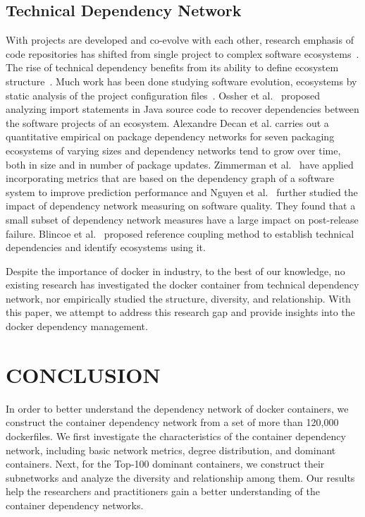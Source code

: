 \documentclass[sigconf]{acmart}
\begin{document}
\subsection{Technical Dependency Network}
With projects are developed and co-evolve with each other, research emphasis of code repositories has 
shifted from single project to complex software ecosystems~\cite{zhang2018within}. 
The rise of technical dependency benefits from its ability to define ecosystem structure~\cite{lungu2010recovering}. 
Much work has been done studying software evolution, ecosystems 
by static analysis of the project configuration files~\cite{gonzalez2009macro,lungu2009reverse,santana2013towards}.  
Ossher et al.~\cite{ossher2010automated} proposed analyzing import statements in Java source code to recover dependencies 
between the software projects of an ecosystem. 
Alexandre Decan et al. carries out a quantitative empirical on package dependency networks for seven 
packaging ecosystems of varying sizes and 
dependency networks tend to grow over time, both in size and in number of package updates. 
Zimmerman et al.~\cite{zimmermann2008predicting}  have applied incorporating metrics that are based on the 
dependency graph of a software system to improve prediction performance and Nguyen et al.~\cite{nguyen2010studying} 
further studied the impact of dependency network measuring on software quality. They found that a small subset of 
dependency network measures have a large
impact on post-release failure. 
Blincoe et al.~\cite{blincoe2015ecosystems} proposed reference coupling method to establish technical dependencies 
and identify ecosystems using it.  



Despite the importance of docker in industry, to the best of our knowledge, no existing research has investigated the docker 
container from technical dependency network, nor empirically studied the structure, diversity, and relationship. 
With this paper, we attempt
to address this research gap and provide insights into the docker dependency management.








\section{CONCLUSION}
\label{sec:co}
In order to better understand the dependency network of docker containers,
we construct the container dependency network from a set of more than 120,000 dockerfiles. We first investigate the characteristics of the container dependency network, including basic network metrics, degree distribution, and dominant containers. Next, for the Top-100 dominant containers, we construct their subnetworks and analyze the diversity and relationship among them. Our results help the researchers and practitioners gain a better understanding of the container dependency networks. 
\end{document}
